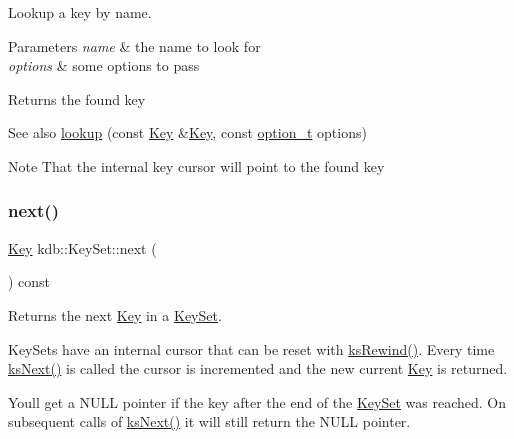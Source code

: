 Lookup a key by name. 


\begin{DoxyParams}{Parameters}
{\em name} & the name to look for \\
\hline
{\em options} & some options to pass\\
\hline
\end{DoxyParams}
\begin{DoxyReturn}{Returns}
the found key 
\end{DoxyReturn}
\begin{DoxySeeAlso}{See also}
\hyperlink{classkdb_1_1KeySet_a78125fb19c6aebb0d8fc1a7238b78ace}{lookup} (const \hyperlink{classkdb_1_1Key}{Key} \&\hyperlink{group__key}{Key}, const \hyperlink{group__keyset_ga98a3d6a4016c9dad9cbd1a99a9c2a45a}{option\+\_\+t} options)
\end{DoxySeeAlso}
\begin{DoxyNote}{Note}
That the internal key cursor will point to the found key 
\end{DoxyNote}
\mbox{\label{classkdb_1_1KeySet_affd52d130faf184361297f9e7f0c9f16}} 
\subsubsection{\texorpdfstring{next()}{next()}}
{\footnotesize\ttfamily \hyperlink{classkdb_1_1Key}{Key} kdb\+::\+Key\+Set\+::next (\begin{DoxyParamCaption}{ }\end{DoxyParamCaption}) const\hspace{0.3cm}{\ttfamily [inline]}}



Returns the next \hyperlink{classkdb_1_1Key}{Key} in a \hyperlink{classkdb_1_1KeySet}{Key\+Set}. 

Key\+Sets have an internal cursor that can be reset with \hyperlink{group__keyset_gabe793ff51f1728e3429c84a8a9086b70}{ks\+Rewind()}. Every time \hyperlink{group__keyset_ga317321c9065b5a4b3e33fe1c399bcec9}{ks\+Next()} is called the cursor is incremented and the new current \hyperlink{classkdb_1_1Key}{Key} is returned.

You\textquotesingle{}ll get a N\+U\+LL pointer if the key after the end of the \hyperlink{classkdb_1_1KeySet}{Key\+Set} was reached. On subsequent calls of \hyperlink{group__keyset_ga317321c9065b5a4b3e33fe1c399bcec9}{ks\+Next()} it will still return the N\+U\+LL pointer.

